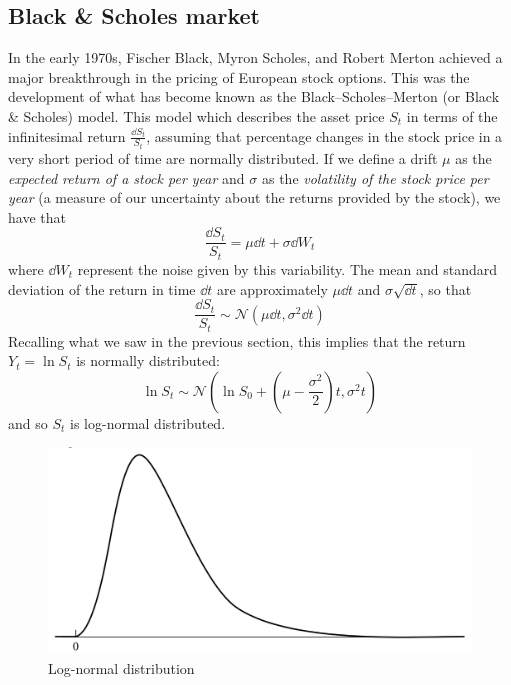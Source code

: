 \subsection{Black \& Scholes market} %
In the early 1970s, Fischer Black, Myron Scholes, and Robert Merton achieved a major breakthrough in the pricing of European stock options. This was the development of what has become known as the Black–Scholes–Merton (or Black \& Scholes) model. 
This model which describes the asset price $S_t$ in terms of the infinitesimal return $\frac{\dd S_t}{S_t}$, assuming that percentage changes in the stock price in a very short period of time are normally distributed. If we define a drift $\mu$ as the \emph{expected return of a stock per year}  and $\sigma$ as the \emph{volatility of the stock price per year} (a measure of our uncertainty about the returns provided by the stock), we have that
\begin{equation}\label{bs}
    \frac{\dd S_t}{S_t} = \mu \dd t + \sigma\dd W_t
\end{equation}
where $\dd W_t$ represent the noise given by this variability. The mean and standard deviation of the return in time $\dd t$ are approximately $\mu\dd t$ and $\sigma\sqrt{\dd t}$, so that
\begin{equation}
    \frac{\dd S_t}{S_t} \sim \mathcal{N}(\mu\dd t, \sigma^2\dd t)
\end{equation}
Recalling what we saw in the previous section, this implies that the return $Y_t = \ln S_t$ is normally distributed:
\begin{equation}
    \ln S_t \sim\mathcal{N}\left(\ln S_0+\left(\mu-\dfrac{\sigma^2}{2}\right)t,\sigma^2 t\right)
\end{equation}
and so $S_t$ is log-normal distributed.
\begin{figure}[htp]
    \centering
    \includegraphics[scale=0.2]{fig/log_norm_distr.png}
    \caption{Log-normal distribution}
    \label{fig:lognorm}
\end{figure}

